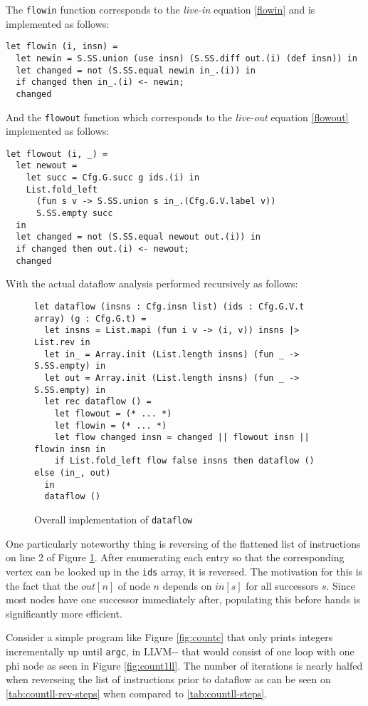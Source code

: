 \documentclass{article}
\begin{document}
\noindent The \texttt{flowin} function corresponds to the \textit{live-in} equation \eqref{flowin} and is implemented as follows:
\begin{verbatim}
let flowin (i, insn) =
  let newin = S.SS.union (use insn) (S.SS.diff out.(i) (def insn)) in
  let changed = not (S.SS.equal newin in_.(i)) in
  if changed then in_.(i) <- newin;
  changed
\end{verbatim}
And the \texttt{flowout} function which corresponds to the \textit{live-out} equation \eqref{flowout} implemented as follows:
\begin{verbatim}
let flowout (i, _) =
  let newout =
    let succ = Cfg.G.succ g ids.(i) in
    List.fold_left
      (fun s v -> S.SS.union s in_.(Cfg.G.V.label v))
      S.SS.empty succ
  in
  let changed = not (S.SS.equal newout out.(i)) in
  if changed then out.(i) <- newout;
  changed
\end{verbatim}

With the actual dataflow analysis performed recursively as follows:
\begin{figure}[H]
\begin{verbatim}
let dataflow (insns : Cfg.insn list) (ids : Cfg.G.V.t array) (g : Cfg.G.t) =
  let insns = List.mapi (fun i v -> (i, v)) insns |> List.rev in
  let in_ = Array.init (List.length insns) (fun _ -> S.SS.empty) in
  let out = Array.init (List.length insns) (fun _ -> S.SS.empty) in
  let rec dataflow () =
    let flowout = (* ... *)
    let flowin = (* ... *)
    let flow changed insn = changed || flowout insn || flowin insn in
    if List.fold_left flow false insns then dataflow () else (in_, out)
  in
  dataflow ()
\end{verbatim}
\caption{Overall implementation of \texttt{dataflow}\label{fig:dataflow}}
\end{figure}
\noindent One particularly noteworthy thing is reversing of the flattened list of instructions on line 2 of Figure \ref{fig:dataflow}. After enumerating each entry so that the corresponding vertex can be looked up in the \texttt{ids} array, it is reversed.
The motivation for this is the fact that the \(\mathit{out}[n]\) of node \(n\) depends on \(\mathit{in}[s]\) for all successors \(s\). Since most nodes have one successor immediately after, populating this before hands is significantly more efficient.

Consider a simple program like Figure \ref{fig:countc} that only prints integers incrementally up until \texttt{argc}, in LLVM-{}-  that would consist of one loop with one phi node as seen in Figure \ref{fig:count1ll}. The number of iterations is nearly halfed when reverseing the list of instructions prior to dataflow as can be seen on \ref{tab:countll-rev-steps} when compared to \ref{tab:countll-steps}.
\end{document}
